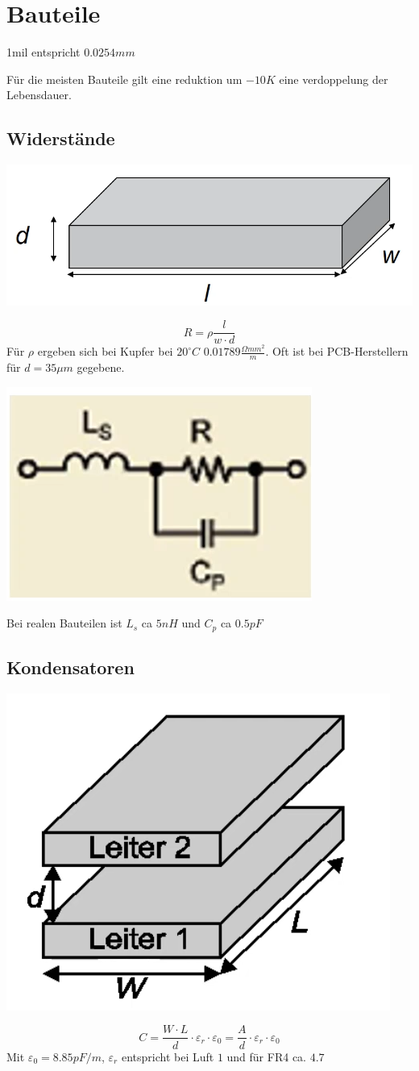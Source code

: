 \section{Bauteile}
1mil entspricht $0.0254mm$

Für die meisten Bauteile gilt eine reduktion um $-10K$ eine verdoppelung der Lebensdauer.
\subsection{Widerstände}
\begin{center}
	\includegraphics[width=0.4\columnwidth]{Images/widerstand}
\end{center}
\[
R = \rho \frac{l}{w \cdot d}
\]
Für $\rho$ ergeben sich bei Kupfer bei $20^\circ C$ $0.01789\frac{\Omega mm^2}{m}$. Oft ist bei PCB-Herstellern für $d=35\mu m$ gegebene.

\begin{center}
	\includegraphics[width=0.3\columnwidth]{Images/widerstand1}
\end{center}
Bei realen Bauteilen ist $L_s$ ca $5nH$ und $C_p$ ca $0.5pF$

\subsection{Kondensatoren}
\begin{center}
	\includegraphics[width=0.3\columnwidth]{Images/kondensator}
\end{center}
\[
C = \frac{W\cdot L}{d}\cdot\varepsilon_r\cdot \varepsilon_0 = \frac{A}{d}\cdot\varepsilon_r\cdot \varepsilon_0
\]
Mit $\varepsilon_0 = 8.85pF/m$, $\varepsilon_r$ entspricht bei Luft $1$ und für FR4 ca. $4.7$

